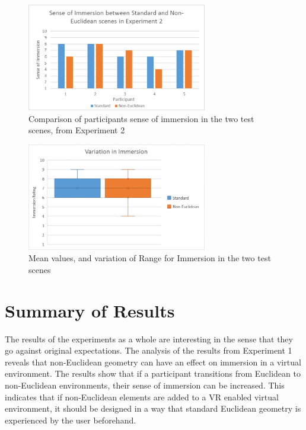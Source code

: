 			\begin{figure}[H]
				\includegraphics[width=0.7\textwidth]{Images/Compare_Immersion_Exp_2}
				\centering
				\caption{Comparison of participants sense of immersion in the two test scenes, from Experiment 2}
				\label{exp:fig:compare_immersion_exp2}
			\end{figure}

			\begin{figure}[H]
				\includegraphics[width=0.7\textwidth]{Images/Compare_Immersion_Variation}
				\centering
				\caption{Mean values, and variation of Range for Immersion in the two test scenes}
				\label{exp:fig:compare_immersion_variation}
			\end{figure}

	\section[Summary]{Summary of Results}
	\label{exp:summary}

		The results of the experiments as a whole are interesting in the sense that they go against original expectations.
		The analysis of the results from Experiment 1 reveals that non-Euclidean geometry can have an effect on immersion in a virtual environment.
		The results show that if a participant transitions from Euclidean to non-Euclidean environments, their sense of immersion can be increased.
		This indicates that if non-Euclidean elements are added to a VR enabled virtual environment, it should be designed in a way that standard Euclidean geometry is experienced by the user beforehand.

